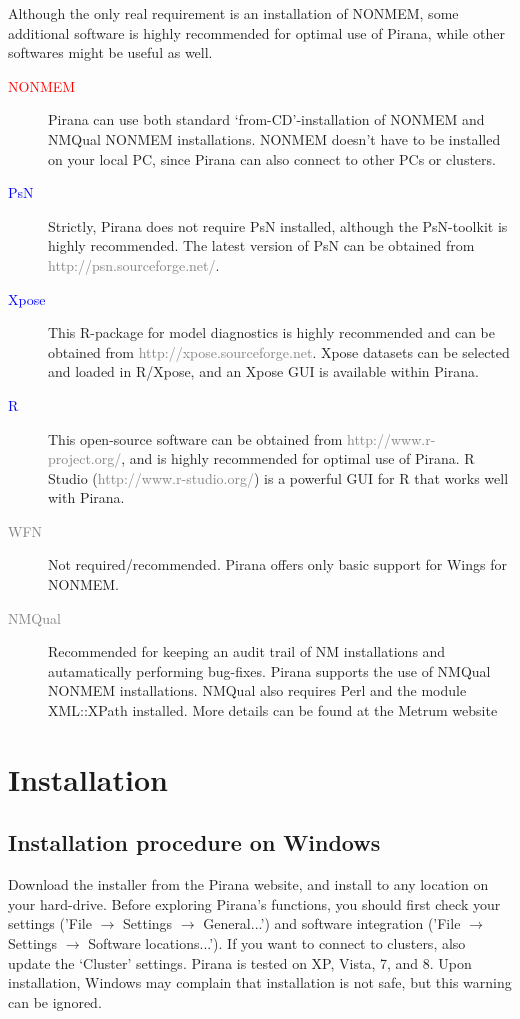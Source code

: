 Although the only real requirement is an installation of NONMEM, some additional software is highly recommended for optimal use of Pirana, while other softwares might be useful as well.

\begin{description}
\item[\textcolor{Red}{NONMEM}] Pirana can use both standard
  `from-CD'-installation of NONMEM and NMQual NONMEM
  installations. NONMEM doesn't have to be installed on your local PC,
  since Pirana can also connect to other PCs or clusters.

\item[\textcolor{Blue}{PsN}] Strictly, Pirana does not require PsN
  installed, although the PsN-toolkit is highly recommended. The latest
  version of PsN can be obtained from \textcolor{Grey}{http://psn.sourceforge.net/}.

\item[\textcolor{Blue}{Xpose}] This R-package for model diagnostics is
  highly recommended and can be obtained from
  \textcolor{Grey}{http://xpose.sourceforge.net}. Xpose datasets can
  be selected and loaded in R/Xpose, and an Xpose GUI is available
  within Pirana.

\item[\textcolor{Blue}{R}] This open-source software can be
obtained from \textcolor{Grey}{http://www.r-project.org/}, and is highly
recommended for optimal use of Pirana. R Studio
(\textcolor{Grey}{http://www.r-studio.org/}) is a powerful GUI for
R that works well with Pirana.

\item[\textcolor{Grey}{WFN}] Not required/recommended. Pirana offers only basic
  support for Wings for NONMEM. 

\item[\textcolor{Grey}{NMQual}] Recommended for keeping an audit trail of NM
  installations and autamatically performing bug-fixes. Pirana
  supports the use of NMQual NONMEM installations. NMQual also
  requires Perl and the module XML::XPath installed. More details can
  be found at the Metrum website
\end{description}

\section{Installation}

\subsection{Installation procedure on Windows} Download the installer
from the Pirana website, and install to any location on your hard-drive. Before exploring
Pirana's functions, you should first check your settings ('File
$\rightarrow$ Settings $\rightarrow$ General...') and software
integration ('File $\rightarrow$ Settings $\rightarrow$ Software
locations...'). If you want to connect to clusters, also update the
`Cluster' settings.  Pirana is tested on XP, Vista, 7, and 8. Upon installation, 
Windows may complain that installation is not safe, but this warning can be ignored.

